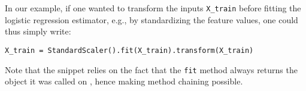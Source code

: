 \documentclass{llncs}
\begin{document}
In our example, if one wanted to transform the inputs \texttt{X\_train} before
fitting the logistic regression estimator, e.g., by standardizing the feature values,
one could thus simply write:
\begin{verbatim}
X_train = StandardScaler().fit(X_train).transform(X_train)
\end{verbatim}

Note that the snippet relies on the fact that the \texttt{fit} method always
returns the object it was called on , hence making method chaining  possible.



\end{document}
